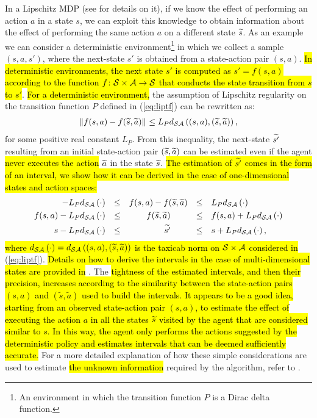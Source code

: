 \newline
In a Lipschitz \ac{MDP} (see  for details on it), if we know the effect of performing an action $a$ in a state $s$, we can exploit this knowledge to obtain information about the effect of performing the same action $a$ on a different state $\widetilde{s}$.
As an example we can consider a deterministic environment\footnote{An environment in which the transition function $P$ is a Dirac delta function.} in which we collect a sample $(s,a,s')$, where the next-state $s'$ is obtained from a state-action pair $(s, a)$. \hl{In deterministic environments, the next state $s'$ is computed as $s' = f(s,a)$ according to the function $f\colon\mathcal{S}\times\mathcal{A}\to\mathcal{S}$ that conducts the state transition from $s$ to $s'$}. \hl{For a deterministic environment,} the assumption of Lipschitz regularity on the transition function $P$ defined in (\ref{eq:liptf}) can be rewritten as:
\begin{align}
	\left\|f(s,a)-f(\widetilde{s},\widetilde{a})\right\|_{} \leq L_{P}d_{\mathcal{S}\mathcal{A}}\left((s,a),(\widetilde{s},\widetilde{a})\right),
\end{align}
for some positive real constant $L_{P}$. From this inequality, the next-state $\widetilde{s'}$ resulting from an initial state-action pair $(\widetilde{s}, \widetilde{a})$ can be estimated even if the agent \hl{never executes the action} $\widetilde{a}$ in the state $\widetilde{s}$. \hl{The estimation of $\widetilde{s'}$ comes in the form of an interval, we show how it can be derived in the case of one-dimensional states and action spaces:}
\begin{align}
	-L_{P}d_{\mathcal{S}\mathcal{A}}\left(\cdot\right) &&\leq&& f(s,a)-f(\widetilde{s},\widetilde{a}) &&\leq&& &L_{P}d_{\mathcal{S}\mathcal{A}}\left(\cdot\right) \nonumber\\
	f(s,a) -L_{P}d_{\mathcal{S}\mathcal{A}}\left(\cdot\right) &&\leq&&  \qquad f(\widetilde{s},\widetilde{a}) \qquad  &&\leq&& &f(s,a) + L_{P}d_{\mathcal{S}\mathcal{A}}\left(\cdot\right) \nonumber\\
	s -L_{P}d_{\mathcal{S}\mathcal{A}}\left(\cdot\right) &&\leq&&  \qquad \widetilde{s'} \qquad  &&\leq&& &s + L_{P}d_{\mathcal{S}\mathcal{A}}\left(\cdot\right),
\end{align}
\hl{where $d_{\mathcal{S}\mathcal{A}}\left(\cdot\right) = d_{\mathcal{S}\mathcal{A}}\left((s,a),(\widetilde{s},\widetilde{a})\right)$ is the taxicab norm on $\mathcal{S} \times \mathcal{A}$ considered in} (\ref{eq:liptf}). \hl{Details on how to derive the intervals in the case of multi-dimensional states are provided in} .
The \hl{tightness of the estimated intervals, and then their precision, increases according to the similarity between the state-action pairs $(s, a)$ and $(\widetilde{s}, \widetilde{a})$ used to build the intervals.
It appears to be a good idea, starting from an observed state-action pair $(s,a)$, to estimate the effect of executing the action $a$ in all the states $\widetilde{s}$ visited by the agent that are considered similar to $s$. In this way, the agent only performs the actions suggested by the deterministic policy and estimates intervals that can be deemed sufficiently accurate.} For a more detailed explanation of how these simple considerations are used to estimate \hl{the unknown information} required by the algorithm, refer to .
